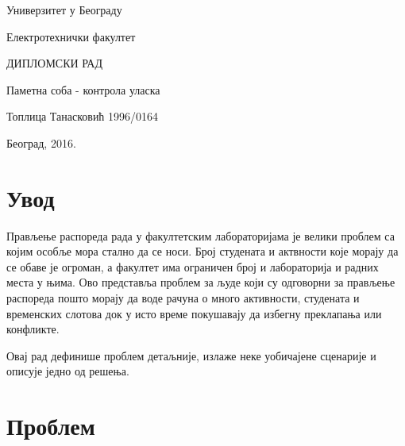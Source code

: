\documentclass[12pt]{article}
\begin{document}
	\begin{center}

		\Large Универзитет у Београду

		\vspace{16pt}

		Електротехнички факултет
		
		\vspace{144pt}
		
		ДИПЛОМСКИ РАД
		
		\vspace{64pt}
		
		\Huge Паметна соба - контрола уласка
		
		\vspace{64pt}
		
		\Large Топлица Танасковић 1996/0164
		
		\vfill
		
		Београд, 2016.
	\end{center}
	\pagebreak
	
	\tableofcontents
	
	\pagebreak
	
	\normalsize
	\setlength{\parindent}{4em}
	\setlength{\JustifyingParindent}{4em}
	
	\section{Увод}
	
	\begin{justify}
		
		Прављење распореда рада у факултетским лабораторијама је велики проблем са којим особље мора стално да се носи. Број студената и актвности које морају да се обаве је огроман, а факултет има ограничен број и лабораторија и радних места у њима. Ово представља проблем за људе који су одговорни за прављење распореда пошто морају да воде рачуна о много активности, студената и временских слотова док у исто време покушавају да избегну преклапања или конфликте.
		
		Овај рад дефинише проблем детаљније, излаже неке уобичајене сценарије и описује једно од решења.
	\end{justify}
		
	\section{Проблем}
	
\end{document}
